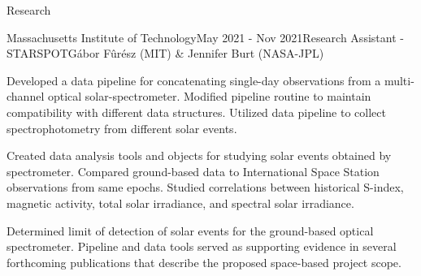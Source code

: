 \documentclass{resume} %
\begin{document}
\begin{rSection}{Research}
\begin{rSubsection}{Massachusetts Institute of Technology}{May 2021 - Nov 2021}{Research Assistant - STARSPOT}{G\'abor F\^ur\'esz (MIT) \& Jennifer Burt (NASA-JPL)}
\item Developed a data pipeline for concatenating single-day observations from a multi-channel optical solar-spectrometer. Modified pipeline routine to maintain compatibility with different data structures. Utilized data pipeline to collect spectrophotometry from different solar events.
\item Created data analysis tools and objects for studying solar events obtained by spectrometer. Compared ground-based data to International Space Station observations from same epochs. Studied correlations between historical S-index, magnetic activity, total solar irradiance, and spectral solar irradiance.
\item Determined limit of detection of solar events for the ground-based optical spectrometer. Pipeline and data tools served as supporting evidence in several forthcoming publications that describe the proposed space-based project scope.
\end{rSubsection}


\end{rSection}
\end{document}
